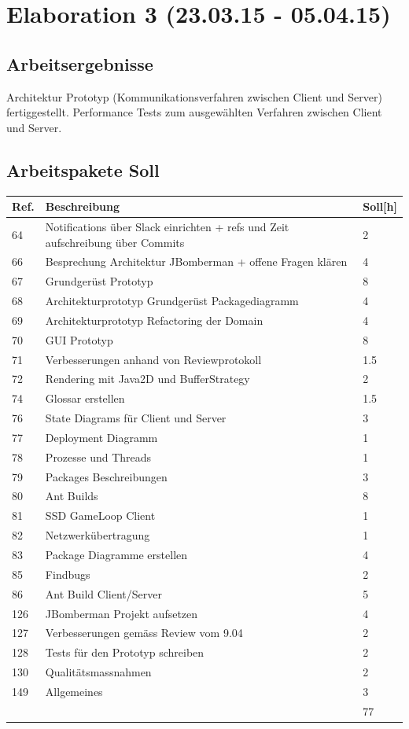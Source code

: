 \documentclass[11pt]{scrartcl}
\begin{document}
\section{Elaboration 3 (23.03.15 - 05.04.15)}
\subsection{Arbeitsergebnisse}
Architektur Prototyp (Kommunikationsverfahren zwischen Client und Server) 
fertiggestellt. 
Performance Tests zum ausgewählten Verfahren zwischen Client und Server.
\subsection{Arbeitspakete Soll}
\begin{longtabu} to \textwidth {
    X[1,l]
    X[10,l]
    X[1,l]}
    \bf{Ref.}  & \bf{Beschreibung} & \bf{Soll[h]}\\
    \hline
    64 & Notifications über Slack einrichten + refs und Zeit aufschreibung über Commits & 2 \\
    66 & Besprechung Architektur JBomberman + offene Fragen klären & 4 \\
    67 &  Grundgerüst Prototyp & 8 \\
    68 & Architekturprototyp Grundgerüst Packagediagramm & 4 \\
    69 &  Architekturprototyp Refactoring der Domain & 4 \\
    70 & GUI Prototyp & 8\\
    71 & 	Verbesserungen anhand von Reviewprotokoll & 1.5\\
    72 & Rendering mit Java2D und BufferStrategy & 2 \\
    74 & Glossar erstellen  & 1.5 \\
    76 & State Diagrams für Client und Server & 3 \\
    77 & Deployment Diagramm & 1\\
    78 & 	Prozesse und Threads & 1 \\
    79 & 	Packages Beschreibungen & 3 \\
    80 & Ant Builds & 8 \\
    81 & SSD GameLoop Client & 1 \\
    82 & Netzwerkübertragung & 1 \\
    83 & Package Diagramme erstellen & 4 \\
    85 & 	Findbugs & 2 \\
    86 & Ant Build Client/Server & 5 \\
    126 & JBomberman Projekt aufsetzen & 4 \\
    127 & Verbesserungen gemäss Review vom 9.04 & 2 \\
    128 & Tests für den Prototyp schreiben & 2 \\
    130 & Qualitätsmassnahmen	& 2 \\
    149 & Allgemeines & 3 \\
    \hline
    & & 77
  \end{longtabu}
  
\end{document}
